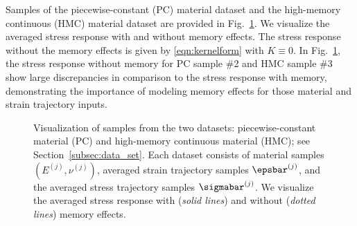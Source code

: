 \documentclass[letterpaper,11pt]{article}
\begin{document}
Samples of the piecewise-constant (PC) material dataset and the high-memory continuous (HMC) material dataset are provided in Fig.~\ref{fig:data_set_visual}. We visualize the averaged stress response with and without memory effects. The stress response without the memory effects is given by \eqref{eqn:kernelform} with $K\equiv 0$. In Fig.~\ref{fig:data_set_visual}, the stress response without memory for PC sample \#2 and HMC sample \#3 show large discrepancies in comparison to the stress response with memory, demonstrating the importance of modeling memory effects for those material and strain trajectory inputs.
\begin{figure}[htbp]
    \centering
    \caption{Visualization of samples from the two datasets: piecewise-constant material (PC) and high-memory continuous material (HMC); see Section~\ref{subsec:data_set}. Each dataset consists of material samples $(E^{(j)}, \nu^{(j)})$, averaged strain trajectory samples $\epsbar^{(j)}$, and the averaged stress trajectory samples $\sigmabar^{(j)}$. We visualize the averaged stress response with (\textit{solid lines}) and without (\textit{dotted lines}) memory effects.}
    \label{fig:data_set_visual}
\end{figure}
\end{document}
